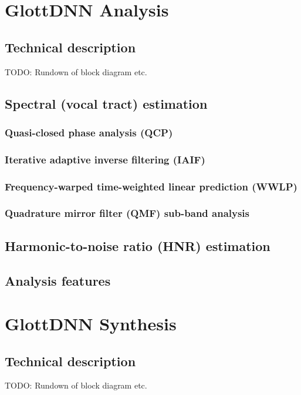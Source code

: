 \documentclass[a4paper, 11pt]{article}
\begin{document}
\section{GlottDNN Analysis}

\subsection{Technical description}
TODO: Rundown of block diagram etc.

\subsection{Spectral (vocal tract) estimation}

\subsubsection{Quasi-closed phase analysis (QCP)}

\subsubsection{Iterative adaptive inverse filtering (IAIF)}

\subsubsection{Frequency-warped time-weighted linear prediction (WWLP)}

\subsubsection{Quadrature mirror filter (QMF) sub-band analysis}

\subsection{Harmonic-to-noise ratio (HNR) estimation}

\subsection{Analysis features}

\section{GlottDNN Synthesis}

\subsection{Technical description}
TODO: Rundown of block diagram etc.
\end{document}
